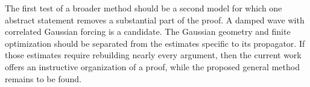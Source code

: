 The first test of a broader method should be a second model for which one
abstract statement removes a substantial part of the proof. A damped wave
with correlated Gaussian forcing is a candidate. The Gaussian geometry and
finite optimization should be separated from the estimates specific to its
propagator. If those estimates require rebuilding nearly every argument,
then the current work offers an instructive organization of a proof, while
the proposed general method remains to be found.

